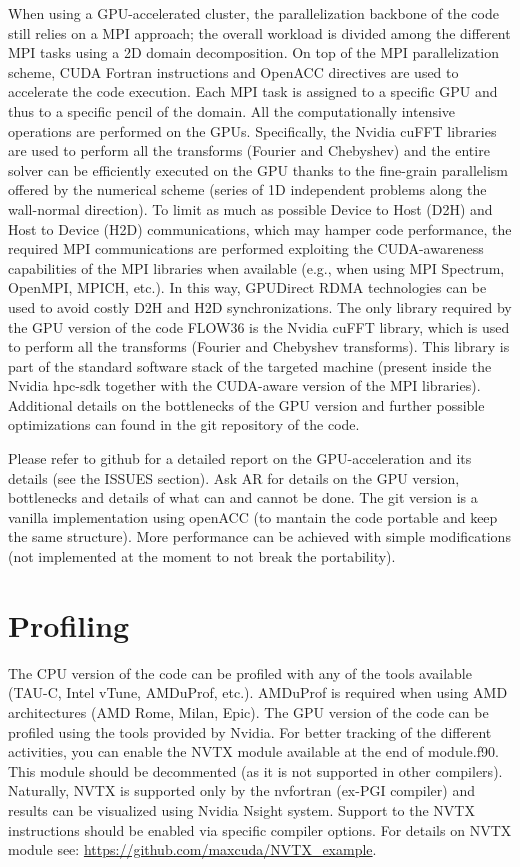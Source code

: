 When using a GPU-accelerated cluster, the parallelization backbone of the code still relies on a MPI approach; the overall workload is divided among the different MPI tasks using a 2D domain decomposition. 
On top of the MPI parallelization scheme, CUDA Fortran instructions and OpenACC directives are used to accelerate the code execution. 
Each MPI task is assigned to a specific GPU and thus to a specific pencil of the domain. 
All the computationally intensive operations are performed on the GPUs. 
Specifically, the Nvidia cuFFT libraries are used to perform all the transforms (Fourier and Chebyshev) and the entire solver can be efficiently executed on the GPU thanks to the fine-grain parallelism offered by the numerical scheme (series of 1D independent problems along the wall-normal direction). 
To limit as much as possible Device to Host (D2H) and Host to Device (H2D) communications, which may hamper code performance, the required MPI communications are performed exploiting the CUDA-awareness capabilities of the MPI libraries when available (e.g., when using MPI Spectrum, OpenMPI, MPICH, etc.). 
In this way, GPUDirect RDMA technologies can be used to avoid costly D2H and H2D synchronizations.
The only library required by the GPU version of the code FLOW36 is the Nvidia cuFFT library, which is used to perform all the transforms (Fourier and Chebyshev transforms). 
This library is part of the standard software stack of the targeted machine (present inside the Nvidia hpc-sdk together with the CUDA-aware version of the MPI libraries).
Additional details on the bottlenecks of the GPU version and further possible optimizations can found in the git repository of the code.

Please refer to github for a detailed report on the GPU-acceleration and its details (see the ISSUES section).
Ask AR for details on the GPU version, bottlenecks and details of what can and cannot be done.
The git version is a vanilla implementation using openACC (to mantain the code portable and keep the same structure).
More performance can be achieved with simple modifications (not implemented at the moment to not break the portability).

\section{Profiling}
\label{sec: profiling}

The CPU version of the code can be profiled with any of the tools available (TAU-C, Intel vTune, AMDuProf, etc.).
AMDuProf is required when using AMD architectures (AMD Rome, Milan, Epic).
The GPU version of the code can be profiled using the tools provided by Nvidia.
For better tracking of the different activities, you can enable the NVTX module available at the end of module.f90.
This module should be decommented (as it is not supported in other compilers).
Naturally, NVTX is supported only by the nvfortran (ex-PGI compiler) and results can be visualized using Nvidia Nsight system.
Support to the NVTX instructions should be enabled via specific compiler options.
For details on NVTX module see: \url{https://github.com/maxcuda/NVTX_example}.



